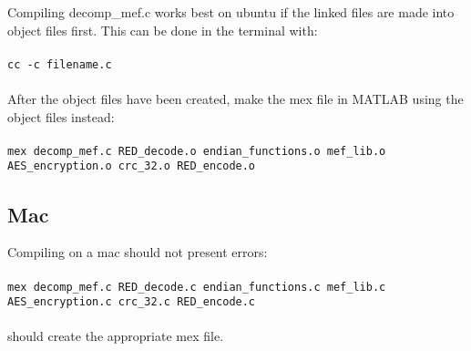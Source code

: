 \documentclass{article}
\begin{document}
\begin{description}
Compiling decomp\_mef.c works best on ubuntu if the linked files are made into object files first. This can be done in the terminal with:\\
\\
\texttt{cc -c filename.c\\}
\\
After the object files have been created, make the mex file in MATLAB using the object files instead:\\
\\
\texttt{mex decomp\_mef.c RED\_decode.o endian\_functions.o mef\_lib.o\\ AES\_encryption.o crc\_32.o RED\_encode.o}\\
\end{description}
\subsection{Mac}
Compiling on a mac should not present errors:\\
\\
\texttt{mex decomp\_mef.c RED\_decode.c endian\_functions.c mef\_lib.c \\AES\_encryption.c crc\_32.c RED\_encode.c}\\
\\
should create the appropriate mex file. 
\end{document}
